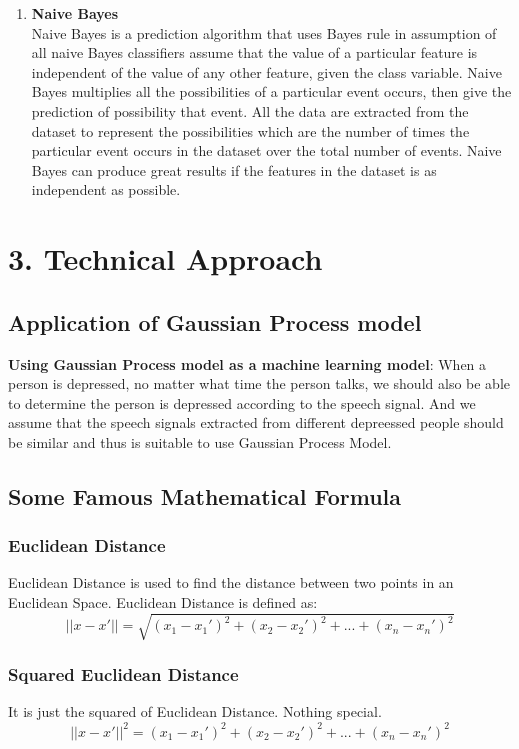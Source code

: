 \documentclass{article}
\begin{document}
\begin{enumerate}
		\item \textbf{Naive Bayes} \\ 
		Naive Bayes is a prediction algorithm that uses Bayes rule in assumption of all naive Bayes classifiers assume that the value of a particular feature is 
		independent of the value of any other feature, given the class variable. Naive Bayes multiplies all the possibilities of a particular event occurs, then 
		give the prediction of possibility that event. All the data are extracted from the dataset to represent the possibilities which are the number of times 
		the particular event occurs in the dataset over the total number of events. Naive Bayes can produce great results if the features in the dataset is as 
	independent as possible. 
	\end{enumerate}

	\section{3. Technical Approach}
	\subsection{Application of Gaussian Process model}
	
	\textbf{Using Gaussian Process model as a machine learning model}: 
	When a person is depressed, no matter what time the person talks, we should also be able to determine the person is depressed according 
	to the speech signal. And we assume that the speech signals extracted from different depreessed people should be similar and thus is suitable 
	to use Gaussian Process Model.

	\subsection{Some Famous Mathematical Formula}
	\subsubsection{Euclidean Distance}
	Euclidean Distance is used to find the distance between two points in an Euclidean Space. Euclidean Distance is defined as:
	\begin{equation}\label{eq:eucdis}
		||x-x'|| = \sqrt{(x_{1} - {x_{1}}')^{2} + (x_{2} - {x_{2}}')^{2} + ... + (x_{n} - {x_{n}}')^{2}}  
	\end{equation}

	\subsubsection{Squared Euclidean Distance}
	It is just the squared of Euclidean Distance. Nothing special.
	\begin{equation}\label{eq:sq_eucdis}
		||x-x'||^{2} = (x_{1} - {x_{1}}')^{2} + (x_{2} - {x_{2}}')^{2} + ... + (x_{n} - {x_{n}}')^{2}  
	\end{equation}
\end{document}

